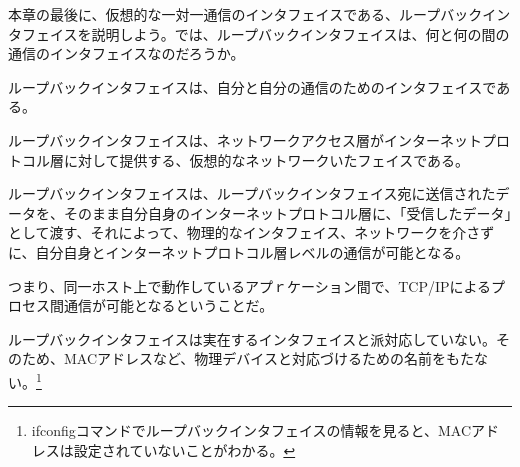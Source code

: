 本章の最後に、仮想的な一対一通信のインタフェイスである、ループバックインタフェイスを説明しよう。では、ループバックインタフェイスは、何と何の間の通信のインタフェイスなのだろうか。

ループバックインタフェイスは、自分と自分の通信のためのインタフェイスである。

ループバックインタフェイスは、ネットワークアクセス層がインターネットプロトコル層に対して提供する、仮想的なネットワークいたフェイスである。

ループバックインタフェイスは、ループバックインタフェイス宛に送信されたデータを、そのまま自分自身のインターネットプロトコル層に、｢受信したデータ｣として渡す、それによって、物理的なインタフェイス、ネットワークを介さずに、自分自身とインターネットプロトコル層レベルの通信が可能となる。

つまり、同一ホスト上で動作しているアプｒケーション間で、TCP/IPによるプロセス間通信が可能となるということだ。

ループバックインタフェイスは実在するインタフェイスと派対応していない。そのため、MACアドレスなど、物理デバイスと対応づけるための名前をもたない。\footnote{ifconfigコマンドでループバックインタフェイスの情報を見ると、MACアドレスは設定されていないことがわかる。}
